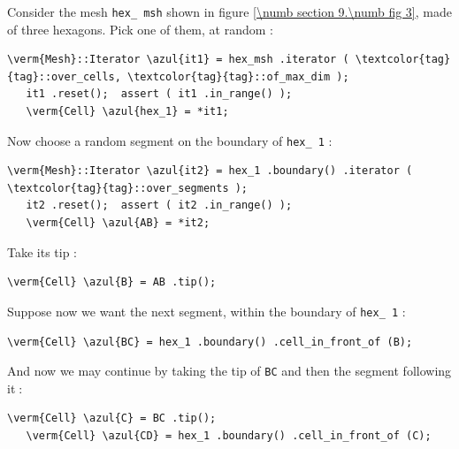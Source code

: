 Consider the mesh {\small\tt hex\_\,msh} shown in figure \ref{\numb section 9.\numb fig 3},
made of three hexagons.
Pick one of them, at random :

\begin{Verbatim}[commandchars=\\\{\},formatcom=\small\tt,
   baselinestretch=0.94,framesep=2mm                      ]
   \verm{Mesh}::Iterator \azul{it1} = hex_msh .iterator ( \textcolor{tag}{tag}::over_cells, \textcolor{tag}{tag}::of_max_dim );
   it1 .reset();  assert ( it1 .in_range() );
   \verm{Cell} \azul{hex_1} = *it1;
\end{Verbatim}

Now choose a random segment on the boundary of {\small\tt hex\_\,1} :

\begin{Verbatim}[commandchars=\\\{\},formatcom=\small\tt,
   baselinestretch=0.94,framesep=2mm                      ]
   \verm{Mesh}::Iterator \azul{it2} = hex_1 .boundary() .iterator ( \textcolor{tag}{tag}::over_segments );
   it2 .reset();  assert ( it2 .in_range() );
   \verm{Cell} \azul{AB} = *it2;
\end{Verbatim}

Take its tip :

\begin{Verbatim}[commandchars=\\\{\},formatcom=\small\tt,
   baselinestretch=0.94,framesep=2mm                      ]
   \verm{Cell} \azul{B} = AB .tip();
\end{Verbatim}

Suppose now we want the next segment, within the boundary of {\small\tt hex\_\,1} :

\begin{Verbatim}[commandchars=\\\{\},formatcom=\small\tt,
   baselinestretch=0.94,framesep=2mm                      ]
   \verm{Cell} \azul{BC} = hex_1 .boundary() .cell_in_front_of (B);
\end{Verbatim}

And now we may continue by taking the tip of {\small\tt BC} and then the segment
following it$\;$:

\begin{Verbatim}[commandchars=\\\{\},formatcom=\small\tt,
   baselinestretch=0.94,framesep=2mm                      ]
   \verm{Cell} \azul{C} = BC .tip();
   \verm{Cell} \azul{CD} = hex_1 .boundary() .cell_in_front_of (C);
\end{Verbatim}

